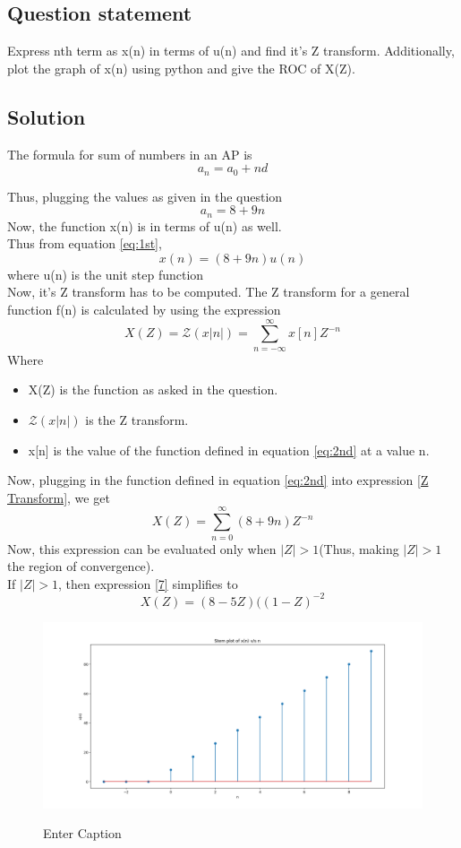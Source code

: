 \documentclass[journal,12pt,twocolumn]{IEEEtran}
\theoremstyle{remark}
\begin{document}
\subsection{Question statement}
Express nth term as x(n) in terms of u(n) and find it's Z transform. Additionally, plot the graph of x(n) using python and give the ROC of X(Z).\\
\subsection{Solution}
The formula for sum of numbers in an AP is 
$$a_n = a_0 + nd$$
\begin{table}[h]

\end{table}
\bigskip
Thus, plugging the values as given in the question
\begin{equation}\label{eq:1st}a_n = 8+9n\end{equation}
Now, the function x(n) is in terms of u(n) as well.\\ Thus from equation \ref{eq:1st},
\begin{equation}\label{eq:2nd}x(n) = (8 + 9n)u(n)\end{equation}
where u(n) is the unit step function\\
Now, it's Z transform has to be computed.
The Z transform for a general function f(n) is calculated by using the expression
\begin{equation}\label{Z Transform}X(Z) = \mathcal{Z}(x|n|) = \sum^{\infty}_{n=-\infty}x[n]Z^{-n}\end{equation}
Where
\begin{itemize}
    \item X(Z) is the function as asked in the question.
    \item $\mathcal{Z}(x|n|)$ is the Z transform.
    \item x[n] is the value of the function defined in equation \ref{eq:2nd} at a value n.
\end{itemize}
\newpage
Now, plugging in the function defined in equation \ref{eq:2nd} into expression \ref{Z Transform}, we get
\begin{equation}\label{7} X(Z) = \sum^{\infty}_{n=0}(8+9n)Z^{-n}\end{equation}
Now, this expression can be evaluated only when $|Z|>1$(Thus, making $|Z|>1$ the region of convergence).\\
If $|Z|>1$, then expression \ref{7} simplifies to
\begin{equation}\label{8}X(Z) = (8-5Z)({(1-Z)}^{-2}\end{equation}
\newpage
\begin{flushleft}
\begin{figure}[h]
\renewcommand\thefigure{1}
    \caption{Enter Caption}
    \includegraphics[width=1.1\textwidth]{figs/x(n)_plot.png}
    \label{fig:stem-plot}
\end{figure}
\end{flushleft}
\end{document}
